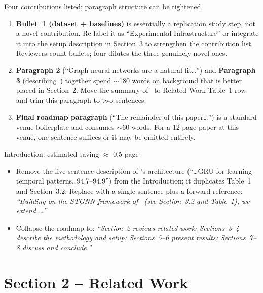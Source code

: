 \documentclass[11pt,a4paper]{article}
\begin{document}
\begin{warnbox}{Four contributions listed; paragraph structure can be tightened}
\begin{enumerate}[leftmargin=*,label=\arabic*.]
  \item \textbf{Bullet~1 (dataset + baselines)} is essentially a replication
    study step, not a novel contribution. Re-label it as ``Experimental
    Infrastructure'' or integrate it into the setup description in
    Section~3 to strengthen the contribution list. Reviewers count bullets;
    four dilutes the three genuinely novel ones.
  \item \textbf{Paragraph 2} (``Graph neural networks are a natural
    fit\ldots'') and \textbf{Paragraph 3} (describing~\cite{Karabulut2026})
    together spend $\sim$180 words on background that is better placed in
    Section~2. Move the summary of~\cite{Karabulut2026} to Related Work
    Table~1 row and trim this paragraph to two sentences.
  \item \textbf{Final roadmap paragraph} (``The remainder of this
    paper\ldots'') is a standard venue boilerplate and consumes $\sim$60
    words. For a 12-page paper at this venue, one sentence suffices or it
    may be omitted entirely.
\end{enumerate}
\end{warnbox}

\begin{trimbox}{Introduction: estimated saving $\approx$ 0.5 page}
\begin{itemize}[leftmargin=*]
  \item Remove the five-sentence description of \cite{Karabulut2026}'s
    architecture (``\ldots GRU for learning temporal patterns\ldots 94.7--94.9'')
    from the Introduction; it duplicates Table~1 and Section~3.2.
    Replace with a single sentence plus a forward reference:
    \textit{``Building on the STGNN framework of~\cite{Karabulut2026} (see
    Section~3.2 and Table~1), we extend \ldots''}
  \item Collapse the roadmap to: \textit{``Section~2 reviews related work;
    Sections~3--4 describe the methodology and setup; Sections~5--6 present
    results; Sections~7--8 discuss and conclude.''}
\end{itemize}
\end{trimbox}

\section{Section 2 -- Related Work}
\end{document}
